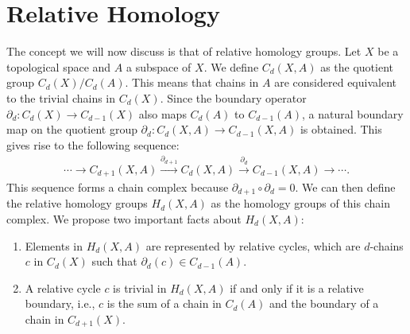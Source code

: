\section{Relative Homology}
\label{RelativeHomology}
The concept we will now discuss is that of relative homology groups. Let \( X \) be a topological space and \( A \) a subspace of \( X \). We define \( C_{d}(X, A) \) as the quotient group \( C_{d}(X) / C_{d}(A) \). This means that chains in \( A \) are considered equivalent to the trivial chains in \( C_{d}(X) \). Since the boundary operator \( \partial_{d}: C_{d}(X) \rightarrow C_{d-1}(X) \) also maps \( C_{d}(A) \) to \( C_{d-1}(A) \), a natural boundary map on the quotient group \( \partial_{d}: C_{d}(X, A) \rightarrow C_{d-1}(X, A) \) is obtained. This gives rise to the following sequence:
\begin{align}
	\cdots \rightarrow C_{d+1}(X, A) \xrightarrow{\partial_{d+1}} C_{d}(X, A) \xrightarrow{\partial_{d}} C_{d-1}(X, A) \rightarrow \cdots. 
\end{align}
This sequence forms a chain complex because \( \partial_{d+1} \circ \partial_{d} = 0 \). We can then define the relative homology groups \( H_{d}(X, A) \) as the homology groups of this chain complex. We propose two important facts about \( H_{d}(X, A) \):

\begin{proposition}{\cite[\S 2.1, p. 115]{hatcher2005algebraic}}
	\begin{enumerate}
		\item Elements in \( H_{d}(X, A) \) are represented by relative cycles, which are \( d \)-chains \( c \) in \( C_{d}(X) \) such that \( \partial_{d}(c) \in C_{d-1}(A) \).
		\item A relative cycle \( c \) is trivial in \( H_{d}(X, A) \) if and only if it is a relative boundary, i.e., \( c \) is the sum of a chain in \( C_{d}(A) \) and the boundary of a chain in \( C_{d+1}(X) \).
	\end{enumerate}
\end{proposition}

